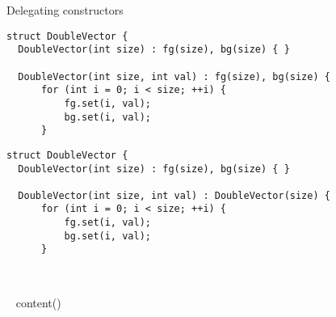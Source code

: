 \begin{frame}[fragile]{Delegating constructors}
    \begin{lstlisting}[style=normal,firstnumber=1]
struct DoubleVector {
  DoubleVector(int size) : fg(size), bg(size) { }

  DoubleVector(int size, int val) : fg(size), bg(size) {
      for (int i = 0; i < size; ++i) {
          fg.set(i, val);
          bg.set(i, val);
      }
        \end{lstlisting}
        \pause
    \begin{lstlisting}[style=normal,firstnumber=1]
struct DoubleVector {
  DoubleVector(int size) : fg(size), bg(size) { }

  DoubleVector(int size, int val) : DoubleVector(size) {
      for (int i = 0; i < size; ++i) {
          fg.set(i, val);
          bg.set(i, val);
      }
        \end{lstlisting}
\end{frame}


~%

~{ content() }~




